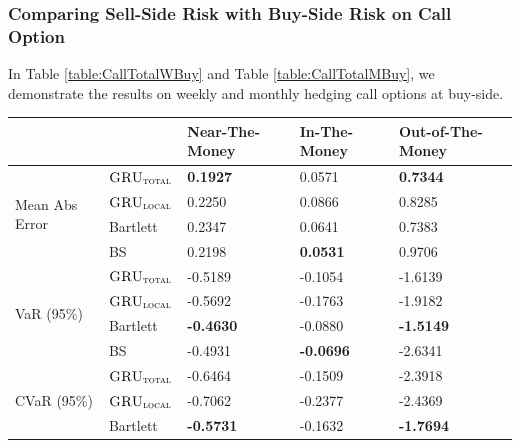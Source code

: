 \documentclass[letterpaper,12pt,titlepage,oneside,final]{book}
\numberwithin{equation}{section}
\theoremstyle{definition}
\newcommand{\modelT}{\textsc{GRU}_{\textsc{total}}}
\newcommand{\modelL}{\textsc{GRU}_{\textsc{local}}}
\begin{document}
\subsubsection{Comparing Sell-Side Risk with Buy-Side Risk on Call Option}
In Table \ref{table:CallTotalWBuy} and  Table \ref{table:CallTotalMBuy},  we demonstrate the results on weekly and monthly hedging call options at buy-side.
\begin{table}[htp!]
	\centering
	\begin{tabular}{ll|l|l|l|}
		\cline{3-5}
		&          & Near-The-Money   & In-The-Money     & Out-of-The-Money \\ \hline
		\multicolumn{1}{|l|}{\multirow{4}{*}{Mean Abs Error}} & $\modelT$     & \textbf{0.1927}  & 0.0571           		 & \textbf{0.7344}   \\  
		\multicolumn{1}{|l|}{}                                & $\modelL$     & 0.2250           & 0.0866          		 	 & 0.8285            \\  
		\multicolumn{1}{|l|}{}                                & Bartlett      & 0.2347           & 0.0641           		 & 0.7383            \\  
		\multicolumn{1}{|l|}{}                                & BS            & 0.2198           & \textbf{0.0531}  		 & 0.9706            \\ 
		\hline
		\multicolumn{1}{|l|}{\multirow{4}{*}{VaR (95\%)}}     & $\modelT$     & -0.5189          & -0.1054 					 & -1.6139  \\  
		\multicolumn{1}{|l|}{}                                & $\modelL$     & -0.5692          & -0.1763          		 & -1.9182           \\  
		\multicolumn{1}{|l|}{}                                & Bartlett      & \textbf{-0.4630} & -0.0880          		 & \textbf{-1.5149}           \\  
		\multicolumn{1}{|l|}{}                                & BS            & -0.4931          & \textbf{-0.0696}          & -2.6341           \\ 
		\hline
		\multicolumn{1}{|l|}{\multirow{4}{*}{CVaR (95\%)}}    & $\modelT$     & -0.6464 		 & -0.1509 					 & -2.3918  \\  
		\multicolumn{1}{|l|}{}                                & $\modelL$     & -0.7062          & -0.2377          		 & -2.4369          \\  
		\multicolumn{1}{|l|}{}                                & Bartlett      & \textbf{-0.5731} & -0.1632          		 & \textbf{-1.7694}          \\  

\end{tabular}
\end{table}
\end{document}
